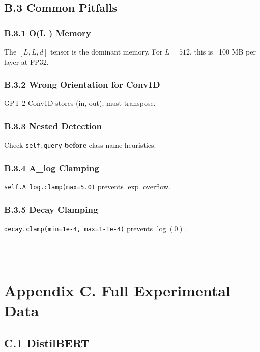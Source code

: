 \subsection{B.3 Common Pitfalls}

\subsubsection{B.3.1 O(L ) Memory}

The $[L, L, d]$ tensor is the dominant memory. For $L = 512$, this is 
~100 MB per layer at FP32.

\subsubsection{B.3.2 Wrong Orientation for Conv1D}

GPT-2 Conv1D stores (in, out); must transpose.

\subsubsection{B.3.3 Nested Detection}

Check \texttt{self.query} \textbf{before} class-name heuristics.

\subsubsection{B.3.4 A\_log Clamping}

\texttt{self.A\_log.clamp(max=5.0)} prevents $\exp$ overflow.

\subsubsection{B.3.5 Decay Clamping}

\texttt{decay.clamp(min=1e-4, max=1-1e-4)} prevents $\log(0)$.
\begin{lstlisting}

---
\end{lstlisting}

\section{Appendix C. Full Experimental Data}

\subsection{C.1 DistilBERT}

